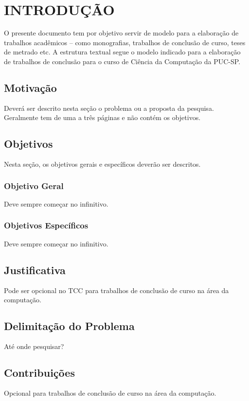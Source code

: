 \chapter{INTRODUÇÃO} \par
O presente documento tem por objetivo servir de modelo para a elaboração de trabalhos acadêmicos --  como monografias, trabalhos de conclusão de curso, teses de metrado etc. A estrutura textual segue o modelo indicado para a elaboração de trabalhos de conclusão para o curso de Ciência da Computação da PUC-SP. 

\section{Motivação}
Deverá ser descrito nesta seção o problema ou a proposta da pesquisa. Geralmente tem de uma a três páginas e não contém os objetivos.

\section{Objetivos}
Nesta seção, os objetivos gerais e específicos deverão ser descritos.

\subsection{Objetivo Geral}
Deve sempre começar no infinitivo.

\subsection{Objetivos Específicos}
Deve sempre começar no infinitivo.

\section{Justificativa}
Pode ser opcional no TCC para trabalhos de conclusão de curso na área da computação.

\section{Delimitação do Problema}
Até onde pesquisar?

\section{Contribuições}
Opcional para trabalhos de conclusão de curso na área da computação.

